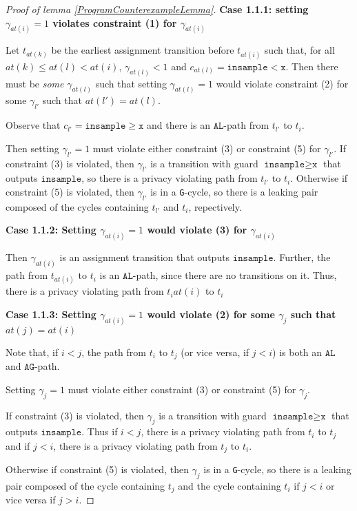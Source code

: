 \documentclass[12pt]{article}
\newcommand{\gguard}[1][x]{\texttt{insample}\geq#1}
\newcommand{\lguard}[1][x]{\texttt{insample} < #1}
\newcommand{\gcycle}{\texttt{G}-cycle}
\theoremstyle{definition}
\begin{document}
\begin{proof}[Proof of lemma \ref{ProgramCounterexampleLemma}]
    \textbf{Case 1.1.1: setting $\gamma_{at(i)} = 1$ violates constraint (1) for $\gamma_{at(i)}$}

    Let $t_{at(k)}$ be the earliest assignment transition before $t_{at(i)}$ such that, for all $at(k)\leq at(l)< at(i)$, $\gamma_{at(l)} <1$ and $c_{at(l)} = \lguard[\texttt{x}]$. Then there must be \textit{some} $\gamma_{at(l)}$ such that setting $\gamma_{at(l)} = 1$ would violate constraint (2) for some $\gamma_{l'}$ such that $at(l') = at(l)$. 

    Observe that $c_{l'} = \gguard[\texttt{x}]$ and there is an $\texttt{AL}$-path from $t_{l'}$ to $t_i$. 

    Then setting $\gamma_{l'}= 1$ must violate either constraint (3) or constraint (5) for $\gamma_{l'}$. If constraint (3) is violated, then $\gamma_{l'}$ is a transition with guard $\gguard[\texttt{x}]$ that outputs $\texttt{insample}$, so there is a privacy violating path from $t_{l'}$ to $t_i$. Otherwise if constraint (5) is violated, then $\gamma_{l'}$ is in a \gcycle, so there is a leaking pair composed of the cycles containing $t_{l'}$ and $t_i$, repectively. 

    \textbf{Case 1.1.2: Setting $\gamma_{at(i)}=1$ would violate (3) for $\gamma_{at(i)}$}

    Then $\gamma_{at(i)}$ is an assignment transition that outputs $\texttt{insample}$. Further, the path from $t_{at(i)}$ to $t_i$ is an $\texttt{AL}$-path, since there are no transitions on it. Thus, there is a privacy violating path from $t_i{at(i)}$ to $t_i$

    \textbf{Case 1.1.3: Setting $\gamma_{at(i)}=1$ would violate (2) for some $\gamma_j$ such that $at(j)= at(i)$}

    Note that, if $i<j$, the path from $t_i$ to $t_j$ (or vice versa, if $j<i$) is both an $\texttt{AL}$ and $\texttt{AG}$-path.

    Setting $\gamma_{j}= 1$ must violate either constraint (3) or constraint (5) for $\gamma_{j}$. 
    
    If constraint (3) is violated, then $\gamma_{j}$ is a transition with guard $\gguard[\texttt{x}]$ that outputs $\texttt{insample}$. Thus if $i<j$, there is a privacy violating path from $t_i$ to $t_j$ and if $j<i$, there is a privacy violating path from $t_j$ to $t_i$. 
    
    Otherwise if constraint (5) is violated, then $\gamma_{j}$ is in a \gcycle, so there is a leaking pair composed of the cycle containing $t_j$ and the cycle containing $t_i$ if $j<i$ or vice versa if $j>i$. 


\end{proof}
\end{document}
